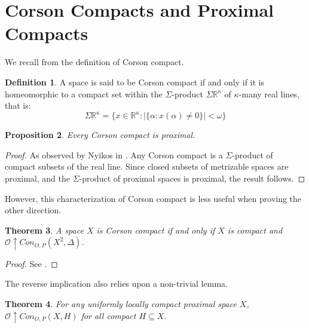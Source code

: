 \documentclass{amsart}
\newtheorem{thm}{Theorem}[section]
\newtheorem{prop}[thm]{Proposition}
\theoremstyle{definition}
\newtheorem{defn}[thm]{Definition}
\theoremstyle{remark}
\newcommand{\<}{\langle}
\renewcommand{\>}{\rangle}
\newcommand{\congame}[2]{Con_{O,P}(#1,#2)}
\newcommand{\pl}[1]{\mathscr{#1}}
\newcommand{\win}{\uparrow}
\begin{document}
\section{Corson Compacts and Proximal Compacts}

We recall from \cite{gcovering} the definition of Corson compact.

\begin{defn}
  A space is said to be Corson compact if and only if it is homeomorphic to a compact set within the $\Sigma$-product $\Sigma\mathbb{R}^\kappa$ of $\kappa$-many real lines, that is:
    \[
      \Sigma\mathbb{R}^\kappa
        =
      \{x\in \mathbb{R}^\kappa: |\{\alpha:x(\alpha)\not=0\}|<\omega\}
    \]
\end{defn}

\begin{prop}
  Every Corson compact is proximal.
\end{prop}

\begin{proof}
  As observed by Nyikos in \cite{nproximal}. Any Corson compact is a $\Sigma$-product of compact subsets of the real line. Since closed subsets of metrizable spaces are proximal, and the $\Sigma$-product of proximal spaces is proximal, the result follows.
\end{proof}

However, this characterization of Corson compact is less useful when proving the other direction.

\begin{thm}
  A space $X$ is Corson compact if and only if $X$ is compact and $\pl O\win\congame{X^2}{\Delta}$.
\end{thm}

\begin{proof}
  See \cite{gcovering}.
\end{proof}

The reverse implication also relies upon a non-trivial lemma.

\begin{thm}
  For any uniformly locally compact proximal space $X$, $\pl O\win \congame{X}{H}$ for all compact $H\subseteq X$.
\end{thm}
\end{document}
